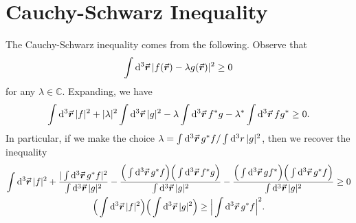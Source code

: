 \section*{Cauchy-Schwarz Inequality}

The Cauchy-Schwarz inequality comes from the following.
Observe that 
\begin{eqnarray}
    \int \dd[3]{\va*{r}} |f(\va*{r}) - \lambda g(\va*{r})|^2 \geq 0
\end{eqnarray}
for any $\lambda \in \mathbb{C}$.
Expanding, we have
\begin{eqnarray}
    \int \dd[3]{\va*{r}} |f|^2 + |\lambda|^2 \int \dd[3]{\va*{r}} |g|^2 - \lambda \int \dd[3]{\va*{r}} f^{*} g - \lambda^{*} \int \dd[3]{\va*{r}}f g^{*}  \geq 0
.\end{eqnarray}
In particular, if we make the choice $\lambda = \int \dd[3]{\va*{r}} g^{*} f / \int \dd[3]{r} |g|^2$, then we recover the inequality
\begin{gather}
    \int \dd[3]{\va*{r}} |f|^2 + \dfrac{|\int \dd[3]{\va*{r}} g^{*} f |^2}{\int \dd[3]{\va*{r}} |g|^2} - \frac{\Big(\int \dd[3]{\va*{r}} g^{*} f \Big) \Big( \int \dd[3]{\va*{r}} f^{*} g \Big)}{\int \dd[3]{\va*{r}} |g|^2} - \frac{ \Big( \int \dd[3]{\va*{r}} g f^{*} \Big) \Big( \int \dd[3]{\va*{r}} g^{*} f \Big) }{\int \dd[3]{\va*{r}} |g|^2} \geq 0 \\
    \Big( \int \dd[3]{\va*{r}} |f|^2 \Big) \Big( \int \dd[3]{\va*{r}} |g|^2 \Big) \geq \Big| \int \dd[3]{\va*{r}} g^{*} f  \Big|^2
.\end{gather}






